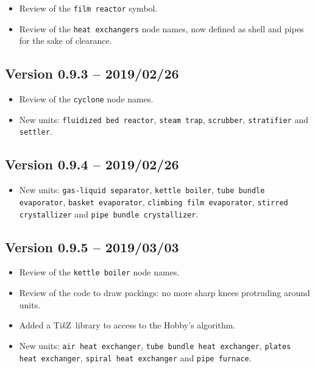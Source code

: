\documentclass[12pt]{article}						%
\newcommand*{\chpn}[1]{\texttt{#1}}				%
\newcommand*{\chpp}[1]{\texttt{#1}}				%
\newcommand*{\TikZ}{Ti\textit{k}Z}
\begin{document}
\begin{itemize}
	\item Review of the \chpp{film reactor} symbol.
	\item Review of the \chpp{heat exchangers} node names, now defined as shell
		and pipes for the sake of clearance.
\end{itemize}

\subsection*{Version 0.9.3 -- 2019/02/26}

\begin{itemize}
	\item Review of the \chpp{cyclone} node names.
	\item New units: \chpp{fluidized bed reactor}, \chpp{steam trap},
		\chpp{scrubber}, \chpp{stratifier} and \chpp{settler}.
\end{itemize}

\subsection*{Version 0.9.4 -- 2019/02/26}

\begin{itemize}
	\item New units: \chpp{gas-liquid separator}, \chpp{kettle boiler},
		\chpp{tube bundle evaporator}, \chpp{basket evaporator},
		\chpp{climbing film evaporator}, \chpp{stirred crystallizer} and
		\chpp{pipe bundle crystallizer}.
\end{itemize}

\subsection*{Version 0.9.5 -- 2019/03/03}

\begin{itemize}
	\item Review of the \chpn{kettle boiler} node names.
	\item Review of the code to draw packings: no more sharp knees protruding
		around units.
	\item Added a \TikZ\ library to access to the Hobby's algorithm.
	\item New units: \chpp{air heat exchanger},
		\chpp{tube bundle heat exchanger}, \chpp{plates heat exchanger},
		\chpp{spiral heat exchanger} and \chpp{pipe furnace}.
\end{itemize}
\end{document}

